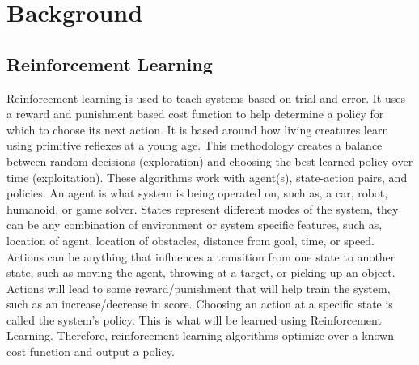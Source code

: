 \documentclass[12pt,american]{report}
\begin{document}
\chapter{Background}
\label{sec:background}

\section{Reinforcement Learning}
Reinforcement learning is used to teach systems based on trial and error.  It uses a reward and punishment based cost function to help determine a policy for which to choose its next action.  It is based around how living creatures learn using primitive reflexes at a young age. This methodology creates a balance between random decisions (exploration) and choosing the best learned policy over time (exploitation). These algorithms work with agent(s), state-action pairs, and policies. An agent is what system is being operated on, such as, a car, robot, humanoid, or game solver. States represent different modes of the system, they can be any combination of environment or system specific features, such as, location of agent, location of obstacles, distance from goal, time, or speed. Actions can be anything that influences a transition from one state to another state, such as moving the agent, throwing at a target, or picking up an object.  Actions will lead to some reward/punishment that will help train the system, such as an increase/decrease in score.  Choosing an action at a specific state is called the system's policy. This is what will be learned using Reinforcement Learning.  Therefore, reinforcement learning algorithms optimize over a known cost function and output a policy.
		    
\end{document}

